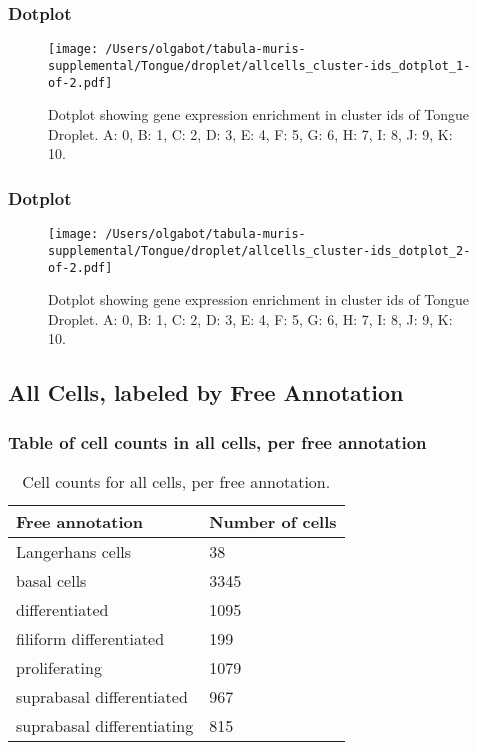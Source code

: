 \newpage
\newpage
\subsubsection{Dotplot}
\begin{figure}[h]
\centering
\texttt{[image: /Users/olgabot/tabula-muris-supplemental/Tongue/droplet/allcells\_cluster-ids\_dotplot\_1-of-2.pdf]}

\caption{ Dotplot  showing gene expression enrichment in cluster ids of Tongue Droplet. A: 0, B: 1, C: 2, D: 3, E: 4, F: 5, G: 6, H: 7, I: 8, J: 9, K: 10.}
\end{figure}


\newpage
\newpage
\subsubsection{Dotplot}
\begin{figure}[h]
\centering
\texttt{[image: /Users/olgabot/tabula-muris-supplemental/Tongue/droplet/allcells\_cluster-ids\_dotplot\_2-of-2.pdf]}

\caption{ Dotplot  showing gene expression enrichment in cluster ids of Tongue Droplet. A: 0, B: 1, C: 2, D: 3, E: 4, F: 5, G: 6, H: 7, I: 8, J: 9, K: 10.}
\end{figure}


\newpage
\subsection{All Cells, labeled by Free Annotation}
\subsubsection{Table of cell counts in all cells, per free annotation}\begin{table}[h]
\centering
\label{my-label}
\begin{tabular}{@{}ll@{}}
\toprule

Free annotation& Number of cells \\ \midrule
Langerhans cells & 38 \\

basal cells & 3345 \\

differentiated & 1095 \\

filiform differentiated & 199 \\

proliferating & 1079 \\

suprabasal differentiated & 967 \\

suprabasal differentiating & 815 \\
\bottomrule
\end{tabular}
\caption{Cell counts for all cells, per free annotation.}
\end{table}

